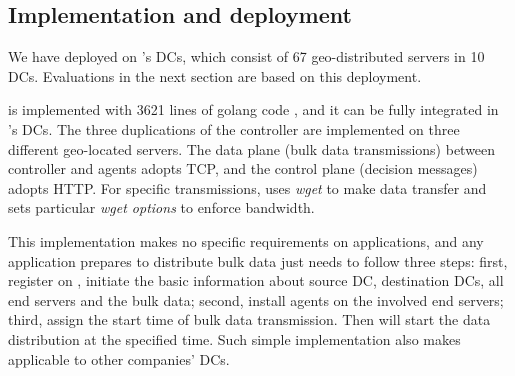 \subsection{Implementation and deployment}
\label{sec:deployment}


We have deployed \name on \company's DCs, which consist of 67 geo-distributed servers in 10 DCs. Evaluations in the next section are based on this deployment. %

\name is implemented with 3621 lines of golang code \cite{golang}, and it can be fully integrated in \company's DCs. The three duplications of the controller are implemented on three different geo-located servers. The data plane (bulk data transmissions) between controller and agents adopts TCP, and the control plane (decision messages) adopts HTTP. For specific transmissions, \name uses \emph{wget} to make data transfer and sets particular \emph{wget options} to enforce bandwidth.

This implementation makes no specific requirements on applications, and any application prepares to distribute bulk data just needs to follow three steps: first, register on \name, initiate the basic information about source DC, destination DCs, all end servers and the bulk data; second, install agents on the involved end servers; third, assign the start time of bulk data transmission. Then \name will start the data distribution at the specified time. Such simple implementation also makes \name applicable to other companies' DCs. 	






%
%
%
%
%


